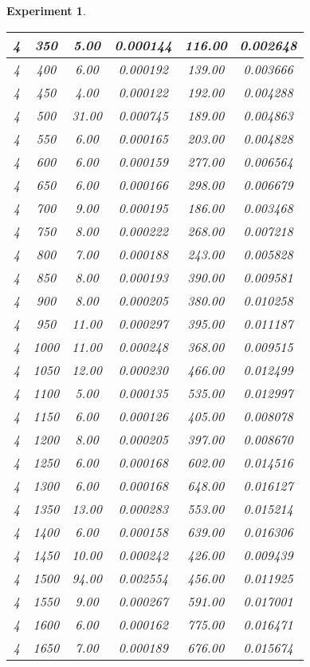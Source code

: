 \documentclass[runningheads,a4paper]{llncs}
\newtheorem{experiment}{Experiment}
\begin{document}
\begin{experiment}
\begin{table}[htpb]
{\begin{tabular}{|c|c|c|c|c|c|}
4 & 350  & 5.00  & 0.000144 & 116.00  & 0.002648 \\ \hline
4 & 400  & 6.00  & 0.000192 & 139.00  & 0.003666 \\ \hline
4 & 450  & 4.00  & 0.000122 & 192.00  & 0.004288 \\ \hline
4 & 500  & 31.00 & 0.000745 & 189.00  & 0.004863 \\ \hline
4 & 550  & 6.00  & 0.000165 & 203.00  & 0.004828 \\ \hline
4 & 600  & 6.00  & 0.000159 & 277.00  & 0.006564 \\ \hline
4 & 650  & 6.00  & 0.000166 & 298.00  & 0.006679 \\ \hline
4 & 700  & 9.00  & 0.000195 & 186.00  & 0.003468 \\ \hline
4 & 750  & 8.00  & 0.000222 & 268.00  & 0.007218 \\ \hline
4 & 800  & 7.00  & 0.000188 & 243.00  & 0.005828 \\ \hline
4 & 850  & 8.00  & 0.000193 & 390.00  & 0.009581 \\ \hline
4 & 900  & 8.00  & 0.000205 & 380.00  & 0.010258 \\ \hline
4 & 950  & 11.00 & 0.000297 & 395.00  & 0.011187 \\ \hline
4 & 1000 & 11.00 & 0.000248 & 368.00  & 0.009515 \\ \hline
4 & 1050 & 12.00 & 0.000230 & 466.00  & 0.012499 \\ \hline
4 & 1100 & 5.00  & 0.000135 & 535.00  & 0.012997 \\ \hline
4 & 1150 & 6.00  & 0.000126 & 405.00  & 0.008078 \\ \hline
4 & 1200 & 8.00  & 0.000205 & 397.00  & 0.008670 \\ \hline
4 & 1250 & 6.00  & 0.000168 & 602.00  & 0.014516 \\ \hline
4 & 1300 & 6.00  & 0.000168 & 648.00  & 0.016127 \\ \hline
4 & 1350 & 13.00 & 0.000283 & 553.00  & 0.015214 \\ \hline
4 & 1400 & 6.00  & 0.000158 & 639.00  & 0.016306 \\ \hline
4 & 1450 & 10.00 & 0.000242 & 426.00  & 0.009439 \\ \hline
4 & 1500 & 94.00 & 0.002554 & 456.00  & 0.011925 \\ \hline
4 & 1550 & 9.00  & 0.000267 & 591.00  & 0.017001 \\ \hline
4 & 1600 & 6.00  & 0.000162 & 775.00  & 0.016471 \\ \hline
4 & 1650 & 7.00  & 0.000189 & 676.00  & 0.015674 \\ \hline

\end{tabular}}
\end{table}
\end{experiment}
\end{document}

